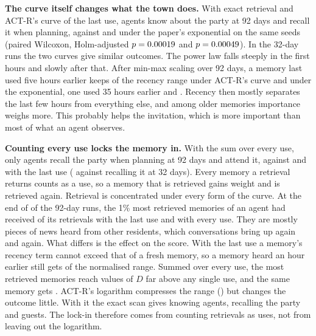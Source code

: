 \textbf{The curve itself changes what the town does.} With exact retrieval and ACT-R's curve of the last use, \TcNinetyLastExAware{} agents know about the party at 92 days and \TcNinetyLastExRecalled{} recall it when planning, against \TcNinetyExpAware{} and \TcNinetyExpRecalled{} under the paper's exponential on the same seeds (paired Wilcoxon, Holm-adjusted $p=0.00019{}$ and $p=0.00049{}$). In the 32-day runs the two curves give similar outcomes. The power law falls steeply in the first hours and slowly after that. After min-max scaling over 92 days, a memory last used five hours earlier keeps \TcShapeActrFive{} of the recency range under ACT-R's curve and \TcShapeExpFive{} under the exponential, one used 35 hours earlier \TcShapeActrThirtyFive{} and \TcShapeExpThirtyFive{}. Recency then mostly separates the last few hours from everything else, and among older memories importance weighs more. This probably helps the invitation, which is more important than most of what an agent observes.

\textbf{Counting every use locks the memory in.} With the sum over every use, only \TcNinetyUsesExRecalled{} agents recall the party when planning at 92 days and \TcNinetyUsesExAtt{} attend it, against \TcNinetyLastExRecalled{} and \TcNinetyLastExAtt{} with the last use (\TcThirtyUsesExRecalled{} against \TcThirtyLastExRecalled{} recalling it at 32 days). Every memory a retrieval returns counts as a use, so a memory that is retrieved gains weight and is retrieved again. Retrieval is concentrated under every form of the curve. At the end of \TcDiagSeeds{} of the 92-day runs, the 1\% most retrieved memories of an agent had received \TcDiagLastTopShare{} of its retrievals with the last use and \TcDiagUsesTopShare{} with every use. They are mostly pieces of news heard from other residents, which conversations bring up again and again. What differs is the effect on the score. With the last use a memory's recency term cannot exceed that of a fresh memory, so a memory heard an hour earlier still gets \TcDiagLastNewHour{} of the normalised range. Summed over every use, the most retrieved memories reach values of $D$ far above any single use, and the same memory gets \TcDiagUsesNewHour{}. ACT-R's logarithm compresses the range (\TcDiagLogNewHour{}) but changes the outcome little. With it the exact scan gives \TcNinetyLogExAware{} knowing agents, \TcNinetyLogExRecalled{} recalling the party and \TcNinetyLogExAtt{} guests. The lock-in therefore comes from counting retrievals as uses, not from leaving out the logarithm.

